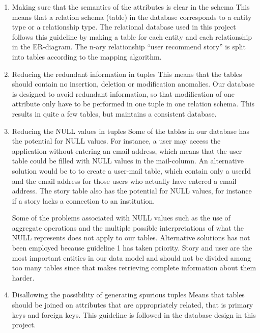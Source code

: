 \begin{enumerate}
\item Making sure that the semantics of the attributes is clear in the schema\newline 
	This means that a relation schema (table) in the database corresponds to a entity type or a relationship type. The relational database used in this project follows this guideline by making a table for each entity and each relationship in the ER-diagram. The n-ary relationship “user recommend story” is split into tables according to the mapping algorithm.
\item Reducing the redundant information in tuples\newline
	This means that the tables should contain no insertion, deletion or modification anomalies. Our database is designed to avoid redundant information, so that modification of one attribute only have to be performed in one tuple in one relation schema. This results in quite a few tables, but maintains a consistent database.
\item Reducing the NULL values in tuples\newline
	Some of the tables in our database has the potential for NULL values. For instance, a user may access the application without entering an email address, which means that the user table could be filled with NULL values in the mail-column. An alternative solution would be to to create a user-mail table, which contain only a userId and the email address for those users who actually have entered a email address. The story table also has the potential for NULL values, for instance if a story lacks a connection to an institution.\newline
	
	Some of the problems associated with NULL values such as the use of aggregate operations and the multiple possible interpretations of what the NULL represents does not apply to our tables. Alternative solutions has not been employed because guideline 1 has taken priority. Story and user are the most important entities in our data model and should not be divided among too many tables since that makes retrieving complete information about them harder. 
\item Disallowing the possibility of generating spurious tuples \newline
	Means that tables should be joined on attributes that are appropriately related, that is primary keys and foreign keys. This guideline is followed in the database design in this project. 
\end{enumerate}

